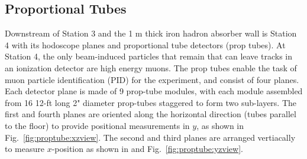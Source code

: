 \subsection{Proportional Tubes}

Downstream of Station 3 and the 1 m thick iron hadron absorber wall is Station 4 with its hodoscope planes and proportional tube  detectors (prop tubes). At Station 4, the only beam-induced particles that remain that can leave tracks in an ionization detector are high energy muons. The prop tubes enable the task of muon particle identification (PID) for the experiment, and consist of four planes. Each detector plane is made of 9 prop-tube modules, with each module assembled from 16 12-ft long 2" diameter prop-tubes staggered to form two sub-layers. The first and fourth planes are oriented along the horizontal direction (tubes parallel to the floor) to provide positional measurements in $y$, as shown in Fig.~\ref{fig:proptube:xzview}. The second and third planes are arranged vertiacally to measure $x$-position as shown in and Fig.~\ref{fig:proptube:yzview}.

